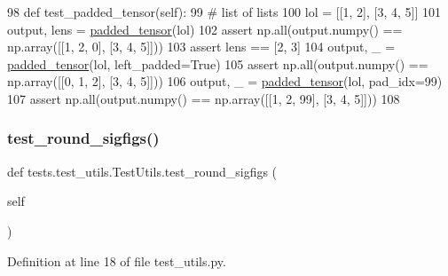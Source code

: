 \begin{DoxyCode}
98     \textcolor{keyword}{def }test\_padded\_tensor(self):
99         \textcolor{comment}{# list of lists}
100         lol = [[1, 2], [3, 4, 5]]
101         output, lens = \hyperlink{namespaceparlai_1_1agents_1_1legacy__agents_1_1seq2seq_1_1utils__v1_adb5a414ae439f14c54e8c760b91cc4c8}{padded\_tensor}(lol)
102         \textcolor{keyword}{assert} np.all(output.numpy() == np.array([[1, 2, 0], [3, 4, 5]]))
103         \textcolor{keyword}{assert} lens == [2, 3]
104         output, \_ = \hyperlink{namespaceparlai_1_1agents_1_1legacy__agents_1_1seq2seq_1_1utils__v1_adb5a414ae439f14c54e8c760b91cc4c8}{padded\_tensor}(lol, left\_padded=\textcolor{keyword}{True})
105         \textcolor{keyword}{assert} np.all(output.numpy() == np.array([[0, 1, 2], [3, 4, 5]]))
106         output, \_ = \hyperlink{namespaceparlai_1_1agents_1_1legacy__agents_1_1seq2seq_1_1utils__v1_adb5a414ae439f14c54e8c760b91cc4c8}{padded\_tensor}(lol, pad\_idx=99)
107         \textcolor{keyword}{assert} np.all(output.numpy() == np.array([[1, 2, 99], [3, 4, 5]]))
108 
\end{DoxyCode}
\mbox{\label{classtests_1_1test__utils_1_1TestUtils_aa020fc67900c834a020730f29cacc916}} 
\subsubsection{\texorpdfstring{test\+\_\+round\+\_\+sigfigs()}{test\_round\_sigfigs()}}
{\footnotesize\ttfamily def tests.\+test\+\_\+utils.\+Test\+Utils.\+test\+\_\+round\+\_\+sigfigs (\begin{DoxyParamCaption}\item[{}]{self }\end{DoxyParamCaption})}



Definition at line 18 of file test\+\_\+utils.\+py.


